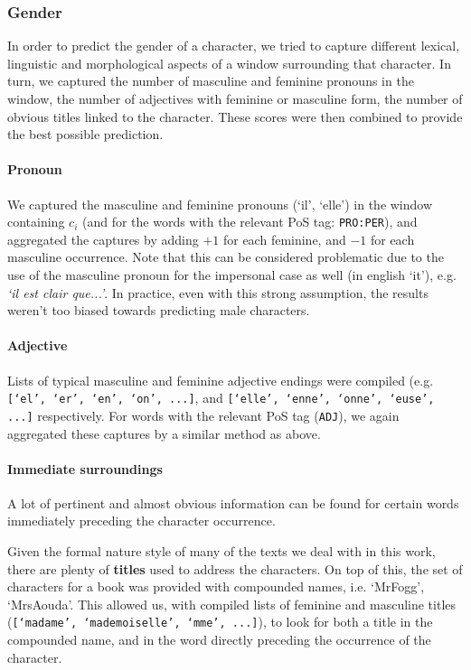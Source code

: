 \subsubsection{Gender} \label{sssec:gender}
In order to predict the gender of a character, we tried to capture different lexical, linguistic and morphological aspects of a window surrounding that character. In turn, we captured the number of masculine and feminine pronouns in the window, the number of adjectives with feminine or masculine form, the number of obvious titles linked to the character. These scores were then combined to provide the best possible prediction.

\paragraph{Pronoun} We captured the masculine and feminine pronouns (`il', `elle') in the window containing $c_i$ (and for the words with the relevant PoS tag: \texttt{PRO:PER}), and aggregated the captures by adding $+1$ for each feminine, and $-1$ for each masculine occurrence. Note that this can be considered problematic due to the use of the masculine pronoun for the impersonal case as well (in english `it'), e.g. \textit{`il est clair que...'}. In practice, even with this strong assumption, the results weren't too biased towards predicting male characters.

\paragraph{Adjective} Lists of typical masculine and feminine adjective endings were compiled (e.g. \texttt{[`el', `er', `en', `on', ...]}, and \texttt{[`elle', `enne', `onne', `euse', ...]} respectively. For words with the relevant PoS tag (\texttt{ADJ}), we again aggregated these captures by a similar method as above.

\paragraph{Immediate surroundings} A lot of pertinent and almost obvious information can be found for certain words immediately preceding the character occurrence. 

Given the formal nature style of many of the texts we deal with in this work, there are plenty of \textbf{titles} used to address the characters. On top of this, the set of characters for a book was provided with compounded names, i.e. `MrFogg', `MrsAouda'. This allowed us, with compiled lists of feminine and masculine titles (\texttt{[`madame', `mademoiselle', `mme', ...]}), to look for both a title in the compounded name, and in the word directly preceding the occurrence of the character.

